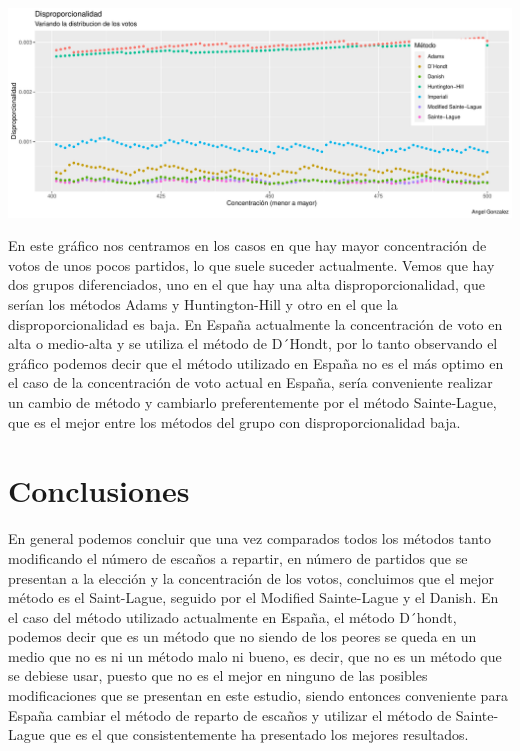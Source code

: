 \documentclass[12pt,a4paper,]{book}
\numberwithin{dummy}{section}
\theoremstyle{ocrenumbox}
\theoremstyle{blacknumex}
\theoremstyle{blacknumbox}
\theoremstyle{ocrenum}
\theoremstyle{ocrenum}
\begin{document}
\begin{center}\includegraphics[width=0.95\linewidth]{figurasR/unnamed-chunk-47-1} \end{center}

En este gráfico nos centramos en los casos en que hay mayor
concentración de votos de unos pocos partidos, lo que suele suceder
actualmente. Vemos que hay dos grupos diferenciados, uno en el que hay
una alta disproporcionalidad, que serían los métodos Adams y
Huntington-Hill y otro en el que la disproporcionalidad es baja. En
España actualmente la concentración de voto en alta o medio-alta y se
utiliza el método de D´Hondt, por lo tanto observando el gráfico podemos
decir que el método utilizado en España no es el más optimo en el caso
de la concentración de voto actual en España, sería conveniente realizar
un cambio de método y cambiarlo preferentemente por el método
Sainte-Lague, que es el mejor entre los métodos del grupo con
disproporcionalidad baja.

\hypertarget{conclusiones}{%
\section{Conclusiones}\label{conclusiones}}

En general podemos concluir que una vez comparados todos los métodos
tanto modificando el número de escaños a repartir, en número de partidos
que se presentan a la elección y la concentración de los votos,
concluimos que el mejor método es el Saint-Lague, seguido por el
Modified Sainte-Lague y el Danish. En el caso del método utilizado
actualmente en España, el método D´hondt, podemos decir que es un método
que no siendo de los peores se queda en un medio que no es ni un método
malo ni bueno, es decir, que no es un método que se debiese usar, puesto
que no es el mejor en ninguno de las posibles modificaciones que se
presentan en este estudio, siendo entonces conveniente para España
cambiar el método de reparto de escaños y utilizar el método de
Sainte-Lague que es el que consistentemente ha presentado los mejores
resultados.
\end{document}
